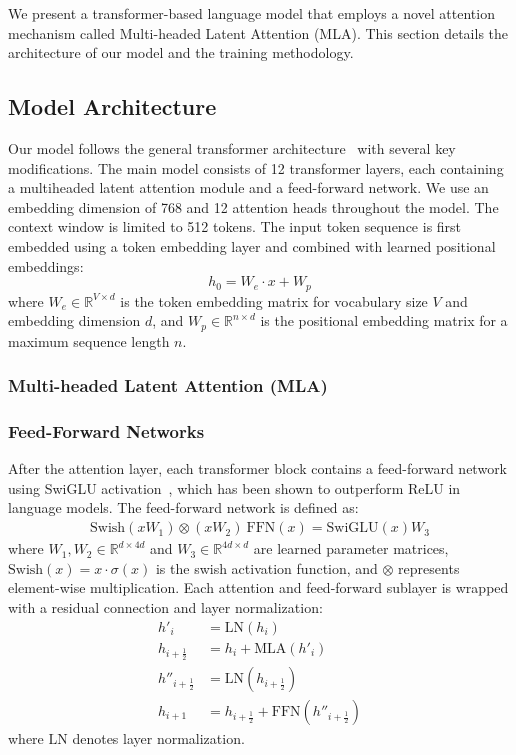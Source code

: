 We present a transformer-based language model that employs a novel attention mechanism called Multi-headed Latent Attention (MLA). This section details the architecture of our model and the training methodology.
\subsection{Model Architecture}
Our model follows the general transformer architecture~\cite{vaswani2017attention} with several key modifications. The main model consists of 12 transformer layers, each containing a multiheaded latent attention module and a feed-forward network. We use an embedding dimension of 768 and 12 attention heads throughout the model. The context window is limited to 512 tokens.
The input token sequence is first embedded using a token embedding layer and combined with learned positional embeddings:
\begin{equation}
h_0 = W_e \cdot x + W_p
\end{equation}
\noindent where $W_e \in \mathbb{R}^{V \times d}$ is the token embedding matrix for vocabulary size $V$ and embedding dimension $d$, and $W_p \in \mathbb{R}^{n \times d}$ is the positional embedding matrix for a maximum sequence length $n$.
\subsubsection{Multi-headed Latent Attention (MLA)}

\subsubsection{Feed-Forward Networks}
After the attention layer, each transformer block contains a feed-forward network using SwiGLU activation~\cite{shazeer2020glu}, which has been shown to outperform ReLU in language models. The feed-forward network is defined as:
\begin{align}
\text{Swish}(xW_1) \otimes (xW_2) \
\text{FFN}(x) = \text{SwiGLU}(x)W_3
\end{align}
\noindent where $W_1, W_2 \in \mathbb{R}^{d \times 4d}$ and $W_3 \in \mathbb{R}^{4d \times d}$ are learned parameter matrices, $\text{Swish}(x) = x \cdot \sigma(x)$ is the swish activation function, and $\otimes$ represents element-wise multiplication.
Each attention and feed-forward sublayer is wrapped with a residual connection and layer normalization:
\begin{align}
  h'_i &= \mathrm{LN}(h_i) \\
  h_{i+\frac12} &= h_i + \mathrm{MLA}(h'_i) \\
  h''_{i+\frac12} &= \mathrm{LN}(h_{i+\frac12}) \\
  h_{i+1} &= h_{i+\frac12} + \mathrm{FFN}(h''_{i+\frac12})
\end{align}
\noindent where $\text{LN}$ denotes layer normalization.
